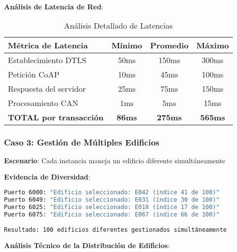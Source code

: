 \textbf{Análisis de Latencia de Red}:
\begin{table}[h]
\centering
\begin{tabular}{|l|c|c|c|}
\hline
\textbf{Métrica de Latencia} & \textbf{Mínimo} & \textbf{Promedio} & \textbf{Máximo} \\
\hline
Establecimiento DTLS & 50ms & 150ms & 300ms \\
Petición CoAP & 10ms & 45ms & 100ms \\
Respuesta del servidor & 25ms & 75ms & 150ms \\
Procesamiento CAN & 1ms & 5ms & 15ms \\
\textbf{TOTAL por transacción} & \textbf{86ms} & \textbf{275ms} & \textbf{565ms} \\
\hline
\end{tabular}
\caption{Análisis Detallado de Latencias}
\label{tab:latencias}
\end{table}

\subsubsection{Caso 3: Gestión de Múltiples Edificios}

\textbf{Escenario}: Cada instancia maneja un edificio diferente simultáneamente \cite{multi_tenant_elevators2022}

\textbf{Evidencia de Diversidad}:
\begin{lstlisting}[language=bash,caption={Distribución de Edificios Entre Instancias},label={lst:distribucion-edificios}]
Puerto 6000: "Edificio seleccionado: E042 (índice 41 de 100)"
Puerto 6049: "Edificio seleccionado: E031 (índice 30 de 100)"
Puerto 6025: "Edificio seleccionado: E018 (índice 17 de 100)"
Puerto 6075: "Edificio seleccionado: E067 (índice 66 de 100)"

Resultado: 100 edificios diferentes gestionados simultáneamente
\end{lstlisting}

\textbf{Análisis Técnico de la Distribución de Edificios}:

